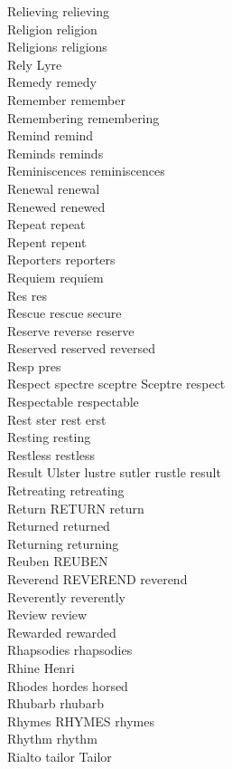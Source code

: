 Relieving relieving\\
Religion religion\\
Religions religions\\
Rely Lyre\\
Remedy remedy\\
Remember remember\\
Remembering remembering\\
Remind remind\\
Reminds reminds\\
Reminiscences reminiscences\\
Renewal renewal\\
Renewed renewed\\
Repeat repeat\\
Repent repent\\
Reporters reporters\\
Requiem requiem\\
Res res\\
Rescue rescue secure\\
Reserve reverse reserve\\
Reserved reserved reversed\\
Resp pres\\
Respect spectre sceptre Sceptre respect\\
Respectable respectable\\
Rest ster rest erst\\
Resting resting\\
Restless restless\\
Result Ulster lustre sutler rustle result\\
Retreating retreating\\
Return RETURN return\\
Returned returned\\
Returning returning\\
Reuben REUBEN\\
Reverend REVEREND reverend\\
Reverently reverently\\
Review review\\
Rewarded rewarded\\
Rhapsodies rhapsodies\\
Rhine Henri\\
Rhodes hordes horsed\\
Rhubarb rhubarb\\
Rhymes RHYMES rhymes\\
Rhythm rhythm\\
Rialto tailor Tailor\\

